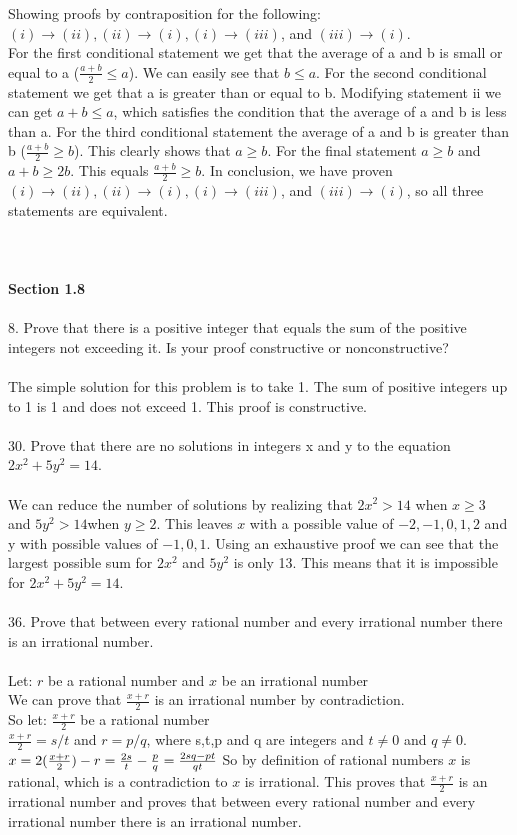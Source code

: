 \documentclass[11pt, oneside]{article}   	%
\begin{document}
Showing proofs by contraposition for the following: $(i)\to (ii), (ii)\to (i), (i)\to (iii)$, and $(iii)\to (i).$\\
For the first conditional statement we get that the average of a and b is small or equal to a ($\frac{a+b}{2}\leq a$). We can easily see that $b\leq a$. For the second conditional statement we get that a is greater than or equal to b. Modifying statement ii we can get $a + b \leq  a$, which satisfies the condition that the average of a and b is less than a. For the third conditional statement the average of a and b is greater than b ($\frac{a+b}{2}\geq b$). This clearly shows that $a\geq b$. For the final statement $a\geq b $ and $a + b\geq 2b$. This equals $\frac{a+b}{2}\geq b$. In conclusion, we have proven $(i)\to (ii), (ii)\to (i), (i)\to (iii)$, and $(iii)\to (i)$, so all three statements are equivalent.\\\\\\\\
\textbf{Section 1.8}\\\\
8. Prove that there is a positive integer that equals the sum of the positive integers not exceeding it. Is your proof constructive or nonconstructive?\\\\
The simple solution for this problem is to take 1. The sum of positive integers up to 1 is 1 and does not exceed 1. This proof is constructive.\\\\
30. Prove that there are no solutions in integers x and y to the equation $2x^2 + 5y^2 = 14$.\\\\
We can reduce the number of solutions by realizing that $2x^2 > 14$ when $x\geq 3$ and $5y^2 > 14 $when $y\geq 2$. This leaves $x$ with a possible value of $-2, -1, 0, 1, 2$ and y with possible values of $-1, 0, 1$. Using an exhaustive proof we can see that the largest possible sum for $2x^2$ and $5y^2$ is only 13. This means that it is impossible for $2x^2 + 5y^2 = 14$.\\\\
36. Prove that between every rational number and every irrational number there is an irrational number.\\\\
Let: $r$ be a rational number and $x$ be an irrational number\\
We can prove that $\frac{x + r}{2}$ is an irrational number by contradiction.\\
So let: $\frac{x + r}{2}$ be a rational number\\
$\frac{x + r}{2} = s/t$ and $r = p/q$, where s,t,p and q are integers and $t\neq 0$ and $q\neq 0$. \\
$ x = 2(\frac{x + r}{2}) - r = \frac{2s}{t} -\frac{p}{q} =\frac{2sq - pt}{qt}\\$
So by definition of rational numbers $x$ is rational, which is a contradiction to $x$ is irrational. This proves that $\frac{x + r}{2}$ is an irrational number and proves that between every rational number and every irrational number there is an irrational number.\\\\
\end{document}
